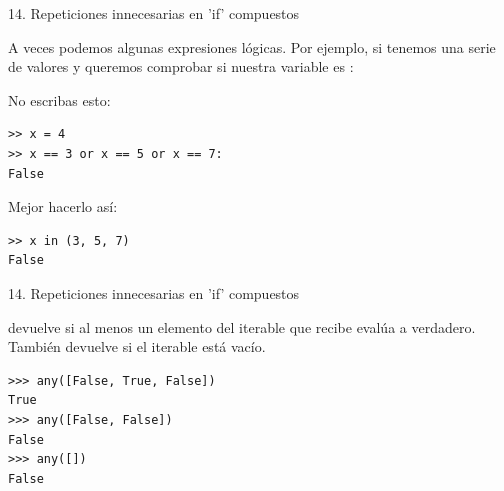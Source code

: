 \documentclass[14pt]{beamer}
\begin{document}
\begin{frame}[fragile]{14. \large Repeticiones innecesarias en 'if' compuestos}
  \small
  \begin{block}{}
    \centering
    A veces podemos  algunas expresiones
    lógicas. Por ejemplo, si tenemos una serie de valores y queremos
    comprobar si nuestra variable es :
  \end{block}

  \footnotesize
  \begin{exampleblock}
    {No escribas esto:}
    \begin{lstlisting}
>> x = 4
>> x == 3 or x == 5 or x == 7:
False
    \end{lstlisting}
  \end{exampleblock}

  \begin{exampleblock}
    {Mejor hacerlo así:}
    \begin{lstlisting}
>> x in (3, 5, 7)
False
    \end{lstlisting}
  \end{exampleblock}
\end{frame}

\begin{frame}[fragile]{14. \large Repeticiones innecesarias en 'if' compuestos}
  \begin{block}{}
    \centering
     devuelve  si al menos un
    elemento del iterable que recibe evalúa a verdadero. También
    devuelve  si el iterable está vacío.
  \end{block}

  \begin{exampleblock}{}
    \begin{lstlisting}
>>> any([False, True, False])
True
>>> any([False, False])
False
>>> any([])
False
    \end{lstlisting}
  \end{exampleblock}
\end{frame}
\end{document}

